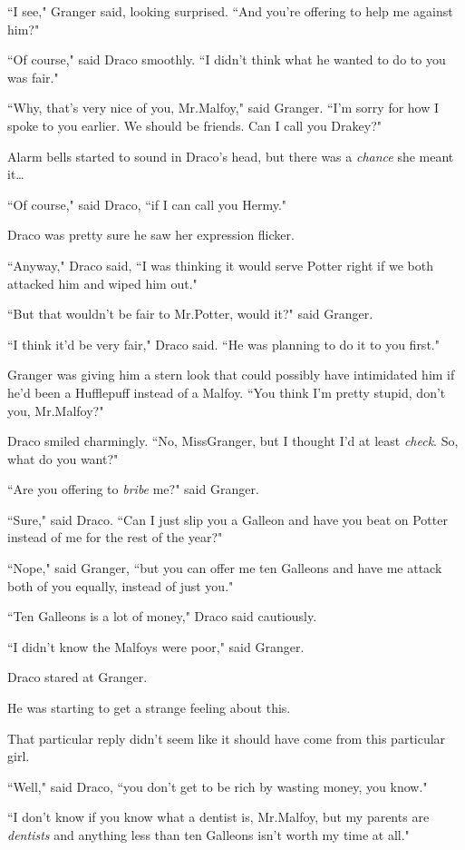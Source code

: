 ``I see," Granger said, looking surprised. ``And you're offering to help me against him?"

``Of course," said Draco smoothly. ``I didn't think what he wanted to do to you was fair."

``Why, that's very nice of you, Mr.\?Malfoy," said Granger. ``I'm sorry for how I spoke to you earlier. We should be friends. Can I call you Drakey?"

Alarm bells started to sound in Draco's head, but there was a \emph{chance} she meant it{\ldots}

``Of course," said Draco, ``if I can call you Hermy."

Draco was pretty sure he saw her expression flicker.

``Anyway," Draco said, ``I was thinking it would serve Potter right if we both attacked him and wiped him out."

``But that wouldn't be fair to Mr.\?Potter, would it?" said Granger.

``I think it'd be very fair," Draco said. ``He was planning to do it to you first."

Granger was giving him a stern look that could possibly have intimidated him if he'd been a Hufflepuff instead of a Malfoy. ``You think I'm pretty stupid, don't you, Mr.\?Malfoy?"

Draco smiled charmingly. ``No, Miss\?Granger, but I thought I'd at least \emph{check}. So, what do you want?"

``Are you offering to \emph{bribe} me?" said Granger.

``Sure," said Draco. ``Can I just slip you a Galleon and have you beat on Potter instead of me for the rest of the year?"

``Nope," said Granger, ``but you can offer me ten Galleons and have me attack both of you equally, instead of just you."

``Ten Galleons is a lot of money," Draco said cautiously.

``I didn't know the Malfoys were poor," said Granger.

Draco stared at Granger.

He was starting to get a strange feeling about this.

That particular reply didn't seem like it should have come from this particular girl.

``Well," said Draco, ``you don't get to be rich by wasting money, you know."

``I don't know if you know what a dentist is, Mr.\?Malfoy, but my parents are \emph{dentists} and anything less than ten Galleons isn't worth my time at all."

